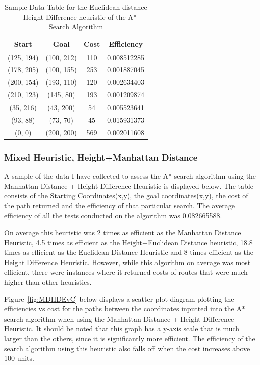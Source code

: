 \documentclass[11pt,oneside]{article}
\begin{document}
    \begin{table}[H]
    \centering
    \begin{tabular}{|c|c|c|c|}
        Start        & Goal       & Cost & Efficiency \\ \hline
        (125, 194)   & (100, 212) & 110 & 0.008512285 \\
        (178, 205)   & (100, 155) & 253 & 0.001887045 \\
        (200, 154)   & (193, 110) & 120 & 0.002634403 \\
        (210, 123)   & (145, 80)  & 193 & 0.001209874 \\
        (35, 216)    & (43, 200)  & 54 & 0.005523641 \\
        (93, 88)     & (73, 70)   & 45 & 0.015931373 \\
        (0, 0)       & (200, 200) & 569 & 0.002011608 \\
    \end{tabular}
    \caption{Sample Data Table for the Euclidean distance + Height Difference heuristic of the A* Search Algorithm}
    \label{tab:my_label}
\end{table}

\subsubsection{Mixed Heuristic, Height+Manhattan Distance}
A sample of the data I have collected to assess the A* search algorithm using the Manhattan Distance + Height Difference Heuristic is displayed below. The table consists of the Starting Coordinates(x,y), the goal coordinates(x,y), the cost of the path returned and the efficiency of that particular search. The average efficiency of all the tests conducted on the algorithm was 0.082665588.

On average this heuristic was 2 times as efficient as the Manhattan Distance Heuristic, 4.5 times as efficient as the Height+Euclidean Distance heuristic, 18.8 times as efficient as the Euclidean Distance Heuristic and 8 times efficient as the Height Difference Heuristic. However, while this algorithm on average was most efficient, there were instances where it returned costs of routes that were much higher than other heuristics.

Figure~\ref{fig:MDHDEvC} below displays a scatter-plot diagram plotting the efficiencies vs cost for the paths between the coordinates inputted into the A* search algorithm when using the Manhattan Distance + Height Difference Heuristic. It should be noted that this graph has a y-axis scale that is much larger than the others, since it is significantly more efficient. The efficiency of the search algorithm using this heuristic also falls off when the cost increases above 100 units.
\end{document}

